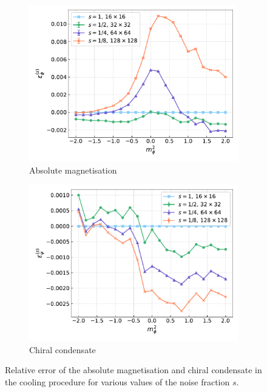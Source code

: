 \begin{figure}[htp]
    \centering
    \begin{subfigure}[b]{0.45\textwidth}
        \includegraphics[width=\textwidth]{figures/cooling/mass_scan/deviation.pdf}
        \caption{Absolute magnetisation}
    \end{subfigure}
    \begin{subfigure}[b]{0.45\textwidth}
        \includegraphics[width=\textwidth]{figures/cooling/mass_scan/deviation_cond.pdf}
        \caption{Chiral condensate}
    \end{subfigure}
    \caption[Relative error in the cooling procedure at tree level.]{Relative error of the absolute magnetisation and chiral condensate in the cooling procedure for various values of the noise fraction $s$.}
    \label{fig:cooling_deviation}
\end{figure}\\
